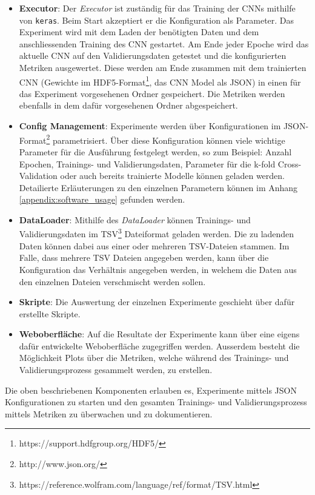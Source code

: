 \begin{itemize}
	\item \textbf{Executor}: Der \emph{Executor} ist zuständig für das Training der CNNs mithilfe von \texttt{keras}. Beim Start akzeptiert er die Konfiguration als Parameter. Das Experiment wird mit dem Laden der benötigten Daten und dem anschliessenden Training des CNN gestartet. Am Ende jeder Epoche wird das aktuelle CNN auf den Validierungsdaten getestet und die konfigurierten Metriken ausgewertet. Diese werden am Ende zusammen mit dem trainierten CNN (Gewichte im HDF5-Format\footnote{https://support.hdfgroup.org/HDF5/}, das CNN Model als JSON) in einen für das Experiment vorgesehenen Ordner gespeichert. Die Metriken werden ebenfalls in dem dafür vorgesehenen Ordner abgespeichert.
	\item \textbf{Config Management}: Experimente werden über Konfigurationen im JSON-Format\footnote{http://www.json.org/} parametrisiert. Über diese Konfiguration können viele wichtige Parameter für die Ausführung festgelegt werden, so zum Beispiel: Anzahl Epochen, Trainings- und Validierungsdaten, Parameter für die k-fold Cross-Validation oder auch bereits trainierte Modelle können geladen werden. Detailierte Erläuterungen zu den einzelnen Parametern können im Anhang \ref{appendix:software_usage} gefunden werden.
	\item \textbf{DataLoader}: Mithilfe des \emph{DataLoader} können Trainings- und Validierungsdaten im TSV\footnote{https://reference.wolfram.com/language/ref/format/TSV.html} Dateiformat geladen werden. Die zu ladenden Daten können dabei aus einer oder mehreren TSV-Dateien stammen. Im Falle, dass mehrere TSV Dateien angegeben werden, kann über die Konfiguration das Verhältnis angegeben werden, in welchem die Daten aus den einzelnen Dateien verschmischt werden sollen.
	\item \textbf{Skripte}: Die Auswertung der einzelnen Experimente geschieht über dafür erstellte Skripte.
	\item \textbf{Weboberfläche}: Auf die Resultate der Experimente kann über eine eigens dafür entwickelte Weboberfläche zugegriffen werden. Ausserdem besteht die Möglichkeit Plots über die Metriken, welche während des Trainings- und Validierungsprozess gesammelt werden, zu erstellen.

\end{itemize}
Die oben beschriebenen Komponenten erlauben es, Experimente mittels JSON Konfigurationen zu starten und den gesamten Trainings- und Validierungsprozess mittels Metriken zu überwachen und zu dokumentieren.

